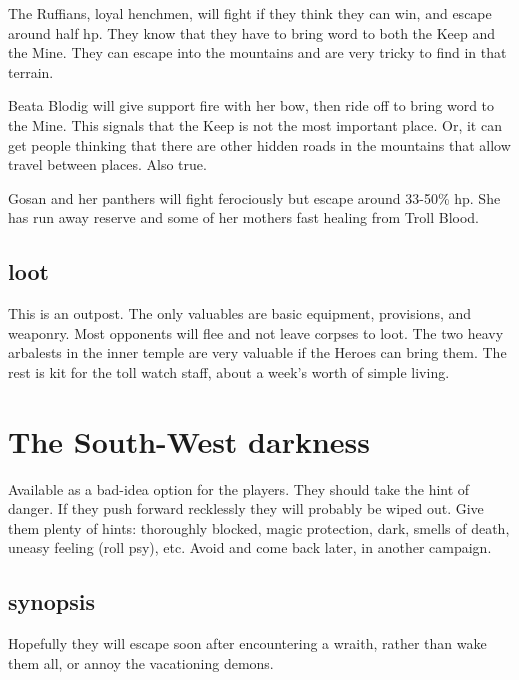 The Ruffians, loyal henchmen, will fight if they think they can win, and escape around half hp. They know that they have to bring word to both the Keep and the Mine. They can escape into the mountains and are very tricky to find in that terrain.

Beata Blodig will give support fire with her bow, then ride off to bring word to the Mine. This signals that the Keep is not the most important place. Or, it can get people thinking that there are other hidden roads in the mountains that allow travel between places. Also true.

Gosan and her panthers will fight ferociously but escape around 33-50\% hp. She has run away reserve and some of her mothers fast healing from Troll Blood.


\subsection*{loot}
This is an outpost. The only valuables are basic equipment, provisions, and weaponry. Most opponents will flee and not leave corpses to loot.
The two heavy arbalests in the inner temple are very valuable if the Heroes can bring them.
The rest is kit for the toll watch staff, about a week's worth of simple living.









\section*{The South-West darkness}
Available as a bad-idea option for the players. They should take the hint of danger. If they push forward recklessly they will probably be wiped out. Give them plenty of hints: thoroughly blocked, magic protection, dark, smells of death, uneasy feeling (roll psy), etc. Avoid and come back later, in another campaign.


\subsection*{synopsis}
Hopefully they will escape soon after encountering a wraith, rather than wake them all, or annoy the vacationing demons.


